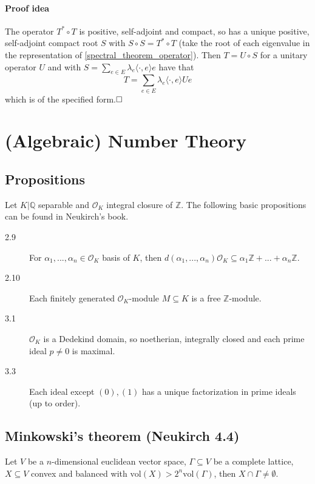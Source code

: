 \documentclass{scrartcl}
\newcommand{\Z}{\mathbb{Z}}
\newcommand{\Q}{\mathbb{Q}}
\begin{document}
\paragraph{Proof idea} 
The operator $T^* \circ T$ is positive, self-adjoint and compact, so has a unique positive, self-adjoint compact root $S$ with $S \circ S = T^* \circ T$ (take the root of each eigenvalue in the representation of \ref{spectral_theorem_operator}).
Then $T = U \circ S$ for a unitary operator $U$ and with $S = \sum_{e \in E} \lambda_e \langle \cdot, e \rangle e$ have that
\begin{equation*}
    T = \sum_{e \in E} \lambda_e \langle \cdot, e \rangle Ue
\end{equation*}
which is of the specified form.$\hfill\square$

\section{(Algebraic) Number Theory}

\subsection{Propositions}
Let $K|\Q$ separable and $\mathcal{O}_K$ integral closure of $\Z$. The following basic propositions can be found in Neukirch's book.
\begin{description}
    \item[2.9] For $\alpha_1, ..., \alpha_n \in \mathcal{O}_K$ basis of $K$, then $d(\alpha_1, ..., \alpha_n)\mathcal{O}_K \subseteq \alpha_1 \Z + ... + \alpha_n \Z$.
    \item[2.10] Each finitely generated $\mathcal{O}_K$-module $M \subseteq K$ is a free $\Z$-module. 
    \item[3.1] $\mathcal{O}_K$ is a Dedekind domain, so noetherian, integrally closed and each prime ideal $p \neq 0$ is maximal.
    \item[3.3] Each ideal except $(0), (1)$ has a unique factorization in prime ideals (up to order). 
\end{description}

\subsection{Minkowski's theorem (Neukirch 4.4)}
Let $V$ be a $n$-dimensional euclidean vector space, $\Gamma \subseteq V$ be a complete lattice, $X \subseteq V$ convex and balanced with $\mathrm{vol}(X) > 2^n \mathrm{vol}(\Gamma)$, then $X \cap \Gamma \neq \emptyset$.
\end{document}
